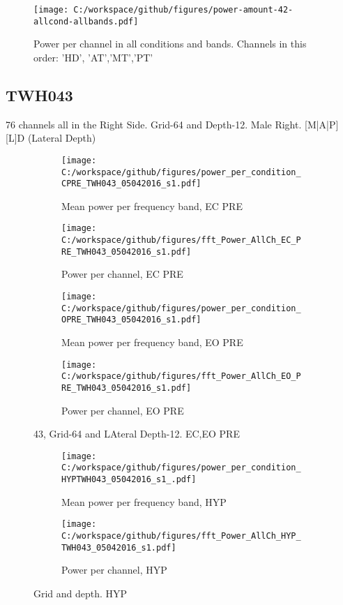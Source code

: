 \documentclass[11pt, onecolumn]{article}
\begin{document}
{%
\begin{figure}[t!]
\texttt{[image: C:/workspace/github/figures/power-amount-42-allcond-allbands.pdf]}
\caption{Power per channel in all conditions and bands. Channels in this order: 'HD', 'AT','MT','PT'} \label{fig:42all}
\end{figure}


\subsection{TWH043}

76 channels all in the Right Side. Grid-64 and Depth-12. Male Right.
[M|A|P][L]D  (Lateral Depth)


\begin{figure}[t!]
\begin{subfigure}{0.48\textwidth}
\texttt{[image: C:/workspace/github/figures/power\_per\_condition\_CPRE\_TWH043\_05042016\_s1.pdf]}
\caption{Mean power per frequency band, EC PRE} \label{fig:a}
\end{subfigure}\hspace*{\fill}
\begin{subfigure}{0.48\textwidth}
\texttt{[image: C:/workspace/github/figures/fft\_Power\_AllCh\_EC\_PRE\_TWH043\_05042016\_s1.pdf]}
\caption{Power per channel, EC PRE} \label{fig:b}
\end{subfigure}

\medskip
\begin{subfigure}{0.48\textwidth}
\texttt{[image: C:/workspace/github/figures/power\_per\_condition\_OPRE\_TWH043\_05042016\_s1.pdf]}
\caption{Mean power per frequency band, EO PRE} \label{fig:a}
\end{subfigure}\hspace*{\fill}
\begin{subfigure}{0.48\textwidth}
\texttt{[image: C:/workspace/github/figures/fft\_Power\_AllCh\_EO\_PRE\_TWH043\_05042016\_s1.pdf]}
\caption{Power per channel, EO PRE} \label{fig:b}
\end{subfigure}
\caption{ 43, Grid-64 and LAteral Depth-12. EC,EO PRE
} \label{fig:43PRE}
\end{figure}




\begin{figure}[t!] %
\begin{subfigure}{0.48\textwidth}
\texttt{[image: C:/workspace/github/figures/power\_per\_condition\_HYPTWH043\_05042016\_s1\_.pdf]}
\caption{Mean power per frequency band, HYP} \label{fig:a}
\end{subfigure}\hspace*{\fill}
\begin{subfigure}{0.48\textwidth}
\texttt{[image: C:/workspace/github/figures/fft\_Power\_AllCh\_HYP\_TWH043\_05042016\_s1.pdf]}
\caption{Power per channel, HYP} \label{fig:b}
\end{subfigure}
\caption{Grid and depth. HYP} \label{fig:42HYP}
\end{figure}



}
\end{document}
